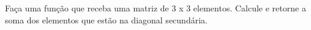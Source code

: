
\question[10]

Faça uma função que receba uma matriz de 3 x 3 elementos. Calcule e retorne a soma dos elementos que estão na diagonal secundária.
